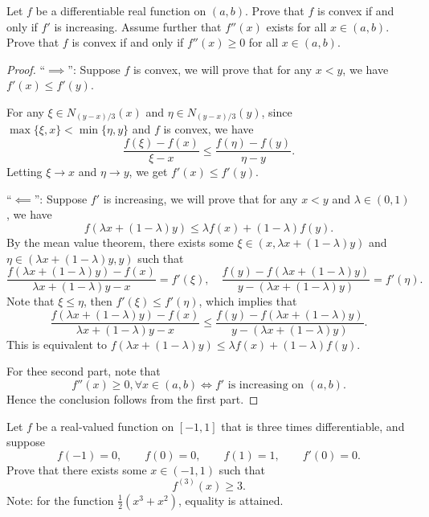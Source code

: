 \documentclass{article}
\begin{document}
\begin{problem}[5-14]
Let $f$ be a differentiable real function on $(a,b)$. Prove that $f$ is convex if and only if $f'$ is increasing. Assume further that $f''(x)$ exists for all $x\in(a,b)$. Prove that $f$ is convex if and only if $f''(x)\ge 0$ for all $x\in(a,b)$.
\end{problem}

\begin{proof}
  ``\( \implies \)'': Suppose \( f \) is convex, we will prove that for any \( x<y \), we have \( f'(x)\le f'(y) \). \par
  For any \( \xi\in N_{(y-x)/3}(x) \) and \( \eta\in N_{(y-x)/3}(y) \), since \( \max\{\xi,x\}<\min\{\eta,y\} \) and \( f \) is convex, we have
  \[ \frac{f(\xi)-f(x)}{\xi-x}\le \frac{f(\eta)-f(y)}{\eta-y}. \]
  Letting \( \xi\to x \) and \( \eta\to y \), we get \( f'(x)\le f'(y) \).\par
  ``\( \impliedby \)'': Suppose \( f' \) is increasing, we will prove that for any \( x<y \) and \( \lambda\in(0,1) \), we have
  \[ f(\lambda x+(1-\lambda)y)\le\lambda f(x)+(1-\lambda) f(y). \]
  By the mean value theorem, there exists some \( \xi\in(x,\lambda x+(1-\lambda)y) \) and \( \eta\in(\lambda x+(1-\lambda)y,y) \) such that
  \[ \frac{f(\lambda x+(1-\lambda)y)-f(x)}{\lambda x+(1-\lambda)y-x}=f'(\xi),\quad \frac{f(y)-f(\lambda x+ (1-\lambda)y)}{y-(\lambda x+(1-\lambda)y)}=f'(\eta). \]
  Note that \( \xi\le\eta \), then \( f'(\xi)\le f'(\eta) \), which implies that
  \[ \frac{f(\lambda x+(1-\lambda)y)-f(x)}{\lambda x+(1-\lambda)y-x}\le \frac{f(y)-f(\lambda x+(1-\lambda)y)}{y-(\lambda x+(1-\lambda)y)}. \]
  This is equivalent to \( f(\lambda x+(1-\lambda)y)\le\lambda f(x)+(1-\lambda) f(y) \).\par
  For thee second part, note that
  \[ f''(x)\ge 0,\forall x\in(a,b)\Leftrightarrow f'\text{ is increasing on }(a,b). \]
  Hence the conclusion follows from the first part.
\end{proof}



\begin{problem}[5-17]
Let $f$ be a real-valued function on $[-1,1]$ that is three times differentiable, and suppose
\[
f(-1)=0,\qquad f(0)=0,\qquad f(1)=1,\qquad f'(0)=0.
\]
Prove that there exists some $x\in(-1,1)$ such that
\[
f^{(3)}(x)\ge 3.
\]
Note: for the function $\tfrac12(x^3+x^2)$, equality is attained.
\end{problem}
\end{document}
